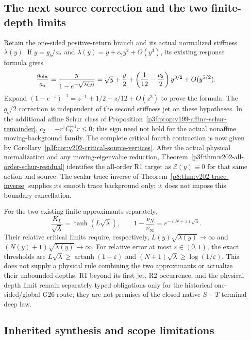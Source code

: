 \documentclass[12pt,a4paper]{article}
\begin{document}
\subsection{The next source correction and the two finite-depth limits}
\label{p8:sec:v199-rar-second-jet}
Retain the one-sided positive-return branch and its actual normalized
stiffness \(\lambda(y)\).  If \(y=g_b/a_*\) and
\(\lambda(y)=y+c_2y^2+O(y^3)\), its existing response formula gives
\begin{equation}
 \frac{g_{\rm obs}}{a_*}
 =\frac{y}{1-e^{-\sqrt{\lambda(y)}}}
 =\sqrt y+\frac y2+\left(\frac1{12}-\frac{c_2}{2}\right)y^{3/2}
 +O(y^{5/2}).
 \label{p8:eq:v199-rar-second-jet-expansion}
\end{equation}
Expand \((1-e^{-z})^{-1}=z^{-1}+1/2+z/12+O(z^3)\) to prove the
formula.  The \(g_b/2\) correction is independent of the second stiffness
jet on these hypotheses.  In the additional affine Schur class of
Proposition~\ref{p3f:prop:v199-affine-schur-remainder},
\(c_2=-r^\dagger C_0^{-1}r\le0\); this sign need not hold for the actual
nonaffine moving-background family. The complete critical fourth
contraction is now given by Corollary~\ref{p3f:cor:v202-critical-source-vertices}.
After the actual physical normalization and any moving-eigenvalue
reduction, Theorem~\ref{p3f:thm:v202-all-order-schur-residual} identifies
the all-order R1 target as $\mathcal E(y)\equiv0$ for that same
action and source. The scalar trace inverse of
Theorem~\ref{p8:thm:v202-trace-inverse} supplies its smooth trace
background only; it does not impose this boundary cancellation.

For the two existing finite approximants separately,
\[
 \frac{K_L}{\sqrt\lambda}=\tanh(L\sqrt\lambda),\qquad
 1-\frac{\nu_N}{\nu_\infty}=e^{-(N+1)\sqrt\lambda}.
\]
Their relative critical limits require, respectively,
\(L(y)\sqrt{\lambda(y)}\to\infty\) and
\((N(y)+1)\sqrt{\lambda(y)}\to\infty\).
For relative error at most \(\varepsilon\in(0,1)\), the exact thresholds are
\(L\sqrt\lambda\ge\operatorname{artanh}(1-\varepsilon)\) and
\((N+1)\sqrt\lambda\ge\log(1/\varepsilon)\).
This does not supply a physical rule combining the two approximants or
actualize their unbounded depths.  R1 beyond its first jet, R2 occurrence,
and the physical depth limit remain separately typed obligations only for the
historical one-sided/global G26 route; they are not premises of the closed
native $S+T$ terminal deep law.

\subsection{Inherited synthesis and scope limitations}\label{p8:sec:first-split-conclusion}
\end{document}
